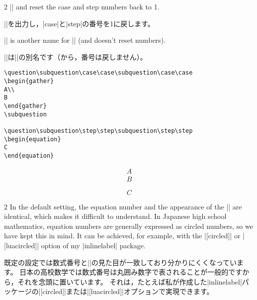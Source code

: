 \documentclass[%
fleqn,%
paper=a4paper,%
fontsize=10pt,%
open_bracket_pos=zenkakunibu_nibu,%
hanging_punctuation,%
]%
{jlreq}
\newenvironment{translateing}%
{\begin{multicolpar}{2}}
{\end{multicolpar}\vspace{\baselineskip}}
\DeclareRobustCommand{\commandtojskip}{\hspace{2.40554pt plus 1.49994pt minus 0.59998pt}}
\begin{document}
\macroexplanation{\subquestion}

\begin{translateing}
|\subquestionauto| and reset the case and step numbers back to 1.

|\subquestionauto|を出力し，|case|と|step|の番号を1に戻します。

|\subquestion*| is another name for |\subquestionauto*| (and doesn't reset numbers).

|\subquestion*|\commandtojskip は\commandtojskip|\subquestionauto*|\commandtojskip の別名です（から，番号は戻しません）。
\end{translateing}

\newpage
\questionreset
\begin{lstlisting}
\question\subquestion\case\case\subquestion\case\case
\begin{gather}
A\\
B
\end{gather}
\subquestion

\question\subquestion\step\step\subquestion\step\step
\begin{equation}
C
\end{equation}
\end{lstlisting}

\begin{macroexample}
\question\subquestion\case\case\subquestion\case\case
\begin{gather}
A\\
B
\end{gather}
\subquestion

\question\subquestion\step\step\subquestion\step\step
\begin{equation}
C
\end{equation}
\end{macroexample}

\begin{translateing}
In the default setting, the equation number and the appearance of the |\subquestion| are identical, which makes it difficult to understand.
In Japanese high school mathematics, equation numbers are generally expressed as circled numbers, so we have kept this in mind.
It can be achieved, for example, with the |[circled]| or |[luacircled]| option of my |inlinelabel| package.

既定の設定では数式番号と|\subquestion|の見た目が一致しており分かりにくくなっています。
日本の高校数学では数式番号は丸囲み数字で表されることが一般的ですから，それを念頭に置いています。
それは，たとえば私が作成した|inlinelabel|パッケージの|[circled]|または|[luacircled]|オプションで実現できます。
\end{translateing}
\end{document}
